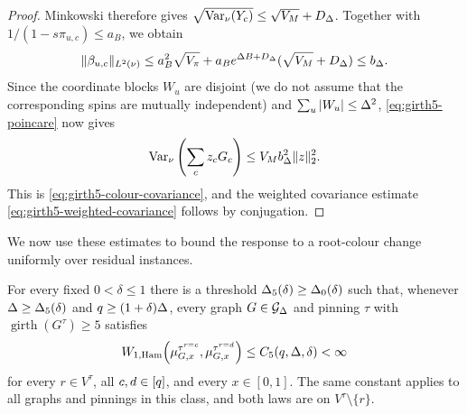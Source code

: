 \begin{proof}
Minkowski therefore gives
$\sqrt{\operatorname{Var}_\nu(Y_c)}\le\sqrt{V_M}+D_\Deg$.
Together with
$1/(1-s\pi_{u,c})\le a_B$, we obtain
\begin{equation}\label{eq:girth5-beta-bound}
 \|\beta_{u,c}\|_{L^2(\nu)}\le a_B^2\sqrt{V_\pi}
 +a_Be^{\Deg B+D_\Deg}(\sqrt{V_M}+D_\Deg)\le b_\Deg.
\end{equation}
Since the coordinate blocks $W_u$ are disjoint (we do not assume that the
corresponding spins are mutually independent) and $\sum_u|W_u|\le\Deg^2$,
\eqref{eq:girth5-poincare} now gives
\[
 \operatorname{Var}_\nu\left(\sum_cz_cG_c\right)\le V_Mb_\Deg^2\|z\|_2^2.
\]
This is \eqref{eq:girth5-colour-covariance}, and the weighted covariance estimate \eqref{eq:girth5-weighted-covariance} follows by
conjugation.
\end{proof}

We now use these estimates to bound the response to a root-colour change
uniformly over residual instances.

\begin{theorem}
\label{thm:girth5-ci}
For every fixed $0<\delta\le1$ there is a threshold
$\Deg_5(\delta)\ge\Deg_0(\delta)$ such that, whenever
$\Deg\ge\Deg_5(\delta)$ and
$q\ge(1+\delta)\Deg$, every graph $G\in\Gdeg$ and pinning $\tau$ with
$\operatorname{girth}(G^\tau)\ge5$ satisfies
\[
 \WHam\!\left(
   \mupin{G}{\tau^{r=c}}{x},
   \mupin{G}{\tau^{r=d}}{x}
 \right)\le C_5(q,\Deg,\delta)<\infty
\]
for every $r\in V^\tau$, all $c,d\in\colours$, and every $x\in[0,1]$.
The same constant applies to all graphs and pinnings in this class, and
both laws are on $V^\tau\setminus\{r\}$.
\end{theorem}

